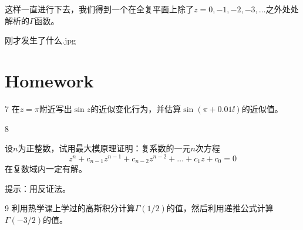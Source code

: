 \documentclass[CJK]{beamer}
\begin{document}
\begin{frame}
  \bch
  这样一直进行下去，我们得到一个在全复平面上除了$z=0,-1,-2,-3,\ldots$之外处处解析的$\Gamma$函数。

  \ech
\end{frame}

\begin{frame}
  \bch
  \bcenter
  刚才发生了什么.jpg
  \ecenter
  \ech
\end{frame}

\section{Homework}

\begin{frame}
  \bch
  \bitem
\item[7]{在$z=\pi$附近写出$\sin z$的近似变化行为，并估算$\sin(\pi + 0.01\ii)$的近似值。}
\item[8]{设$n$为正整数，试用最大模原理证明：复系数的一元$n$次方程
  $$z^n+c_{n-1}z^{n-1}+c_{n-2}z^{n-2}+\ldots + c_1z + c_0 = 0$$
  在复数域内一定有解。

  提示：用反证法。}
\item[9]{利用热学课上学过的高斯积分计算$\Gamma(1/2)$的值，然后利用递推公式计算$\Gamma(-3/2)$的值。}

  \eitem
  \ech
\end{frame}
\end{document}
